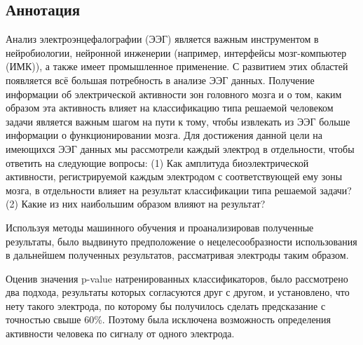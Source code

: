 \newpage
\setcounter{page}{2}

\begin{center}
    \section*{Аннотация}
\end{center}


    Анализ электроэнцефалографии (ЭЭГ) является важным инструментом в нейробиологии,
    нейронной инженерии (например, интерфейсы мозг-компьютер (ИМК)), а также имеет промышленное 
    применение. С развитием этих областей появляется всё большая потребность в анализе 
    ЭЭГ данных. Получение информации об электрической активности зон головного мозга
    и о том, каким образом эта активность влияет на классификацию типа решаемой человеком
    задачи является важным шагом на пути к тому, чтобы извлекать из ЭЭГ больше информации
    о функционировании мозга. Для достижения данной цели на имеющихся ЭЭГ данных мы
    рассмотрели каждый электрод в отдельности, чтобы ответить на следующие вопросы:
    (1) Как амплитуда биоэлектрической активности, регистрируемой каждым электродом
    с соответствующей ему зоны мозга, в отдельности влияет на результат классификации типа
    решаемой задачи? (2) Какие из них наибольшим образом влияют на результат?

    Используя методы машинного обучения и проанализировав полученные результаты, было
    выдвинуто предположение о нецелесообразности использования в дальнейшем полученных результатов,
    рассматривая электроды таким образом.


    Оценив значения p-value натренированных классификаторов, было рассмотрено два подхода,
    результаты которых согласуются друг с другом, и установлено, что нету такого электрода,
    по которому бы получилось сделать предсказание с точностью свыше 60\%. Поэтому была
    исключена возможность определения активности человека по сигналу от одного электрода.
    

